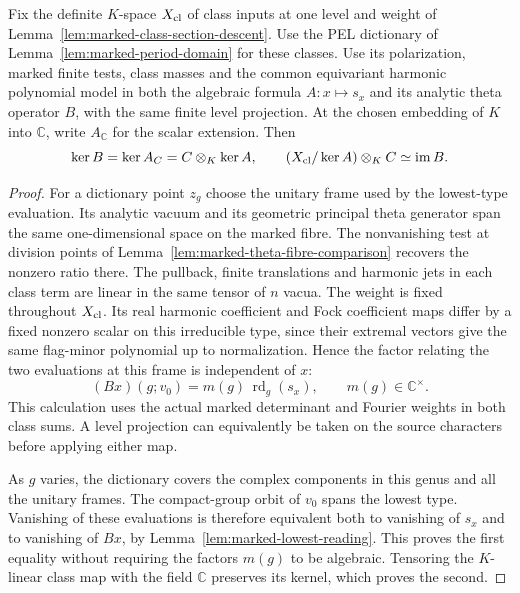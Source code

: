 \begin{auxlemma}
\label{lem:marked-class-kernel-quotient}
Fix the definite \(K\)-space \(X_{\rm cl}\) of class inputs at one
level and weight of Lemma~\ref{lem:marked-class-section-descent}.
Use the PEL dictionary of Lemma~\ref{lem:marked-period-domain} for
these classes. Use its polarization, marked finite tests, class masses
and the common equivariant harmonic polynomial model in both
the algebraic formula \(A:x\mapsto s_x\) and its analytic theta
operator \(B\), with the same finite level projection. At the chosen
embedding of \(K\) into \(\mathbb C\), write \(A_{\mathbb C}\)
for the scalar extension. Then
\[
  \ker B=\ker A_{\mathbb C}
       =\mathbb C\otimes_K\ker A,\qquad
  (X_{\rm cl}/\ker A)\otimes_K\mathbb C\simeq\operatorname{im}B .
\]
\end{auxlemma}
\begin{proof}
For a dictionary point \(z_g\) choose the unitary frame used by the
lowest-type evaluation. Its analytic vacuum and its geometric
principal theta generator span the same one-dimensional space on
the marked fibre. The nonvanishing test at division points of
Lemma~\ref{lem:marked-theta-fibre-comparison} recovers the nonzero
ratio there. The pullback, finite translations and harmonic jets in
each class term are linear in the same tensor of \(n\) vacua.
The weight is fixed throughout \(X_{\rm cl}\). Its real harmonic
coefficient and Fock coefficient maps differ by a fixed nonzero
scalar on this irreducible type, since their extremal vectors give
the same flag-minor polynomial up to normalization. Hence the factor
relating the two evaluations at this frame is independent of \(x\):
\[
       (Bx)(g;v_0)=m(g)\,\operatorname{rd}_{g}(s_x),
                \qquad m(g)\in\mathbb C^\times .
\]
This calculation uses the actual marked determinant and Fourier
weights in both class sums. A level projection can equivalently be
taken on the source characters before applying either map.

As \(g\) varies, the dictionary covers the complex components in
this genus and all the unitary frames. The compact-group orbit of
\(v_0\) spans the lowest type. Vanishing of these evaluations is
therefore equivalent both to vanishing of \(s_x\) and to vanishing
of \(Bx\), by Lemma~\ref{lem:marked-lowest-reading}. This proves
the first equality without requiring the factors \(m(g)\) to be
algebraic. Tensoring the \(K\)-linear class map with the field
\(\mathbb C\) preserves its kernel, which proves the second.
\end{proof}

